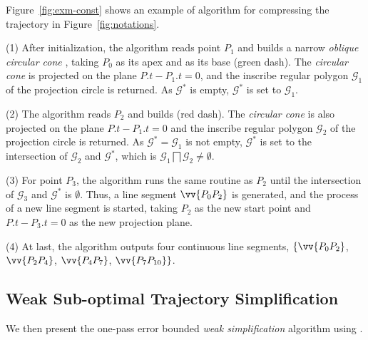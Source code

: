 \begin{example}
\label{exm-alg-conest}
Figure~\ref{fig:exm-const} shows an example of algorithm \cist for compressing the trajectory  in Figure~\ref{fig:notations}.

\sstab (1) After initialization, the \cist algorithm reads point $P_1$ and builds a narrow \emph{oblique circular cone} , taking $P_0$ as its apex and  as its base (green dash). The \emph{circular cone} is projected on the plane $P.t-P_1.t=0$, and the inscribe regular polygon $\mathcal{G}_1$ of the projection circle is returned. As $\mathcal{G}^*$ is empty, $\mathcal{G}^*$ is set to $\mathcal{G}_1$.

\sstab(2) The algorithm reads $P_2$ and builds  (red dash). The \emph{circular cone} is also projected on the plane $P.t-P_1.t=0$ and the inscribe regular polygon $\mathcal{G}_2$ of the projection circle is returned. As $\mathcal{G}^*=\mathcal{G}_1$ is not empty, $\mathcal{G}^*$ is set to the intersection of $\mathcal{G}_2$ and $\mathcal{G}^*$, which is $\mathcal{G}_1 \bigsqcap \mathcal{G}_2 \ne \emptyset$.

\sstab (3) For point $P_3$, the algorithm runs the same routine as $P_2$ until the intersection of $\mathcal{G}_3$ and $\mathcal{G}^*$ is $\emptyset$. Thus, a line segment $\vv{P_0P_2}$ is generated, and the process of a new line segment is started, taking $P_2$ as the new start point and $P.t-P_3.t=0$ as the new projection plane.

\sstab (4) At last, the algorithm outputs four continuous line segments, \ie $\{\vv{P_0P_2}$, $\vv{P_2P_4}$, $\vv{P_4P_{7}}$, $\vv{P_7P_{10}}\}$.
\end{example}





\subsection{Weak Sub-optimal Trajectory Simplification}

We then present the one-pass error bounded {\em weak simplification} algorithm using \sed.




